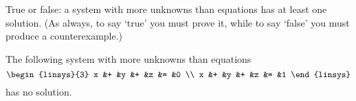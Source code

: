 

\begin{Exercise}[
name={},
title={}, 
difficulty=0,
origin={\cite{JH}}]
True or false: a system with more unknowns than equations
has at least one solution.
(As always, to say `true' you must prove it, while to say 
`false' you must produce a counterexample.)
\end{Exercise}

\begin{Answer}
The following  system with more unknowns than equations
\begin{equation*}
\begin{linsys}{3}
x  &+  &y  &+  &z  &=  &0  \\
x  &+  &y  &+  &z  &=  &1  
\end{linsys}
\end{equation*}
has no solution.   
\end{Answer}
